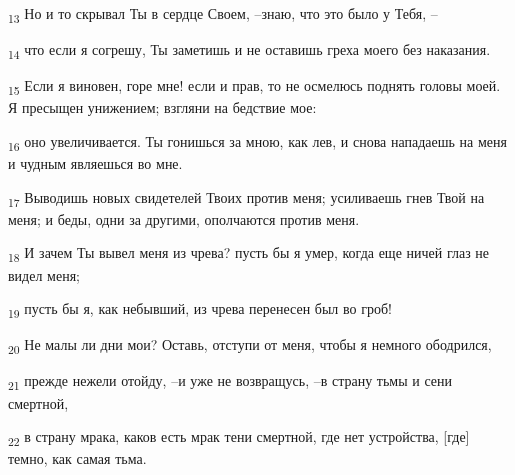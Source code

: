 \begin{tcolorbox}
\textsubscript{13} Но и то скрывал Ты в сердце Своем, --знаю, что это было у Тебя, --
\end{tcolorbox}
\begin{tcolorbox}
\textsubscript{14} что если я согрешу, Ты заметишь и не оставишь греха моего без наказания.
\end{tcolorbox}
\begin{tcolorbox}
\textsubscript{15} Если я виновен, горе мне! если и прав, то не осмелюсь поднять головы моей. Я пресыщен унижением; взгляни на бедствие мое:
\end{tcolorbox}
\begin{tcolorbox}
\textsubscript{16} оно увеличивается. Ты гонишься за мною, как лев, и снова нападаешь на меня и чудным являешься во мне.
\end{tcolorbox}
\begin{tcolorbox}
\textsubscript{17} Выводишь новых свидетелей Твоих против меня; усиливаешь гнев Твой на меня; и беды, одни за другими, ополчаются против меня.
\end{tcolorbox}
\begin{tcolorbox}
\textsubscript{18} И зачем Ты вывел меня из чрева? пусть бы я умер, когда еще ничей глаз не видел меня;
\end{tcolorbox}
\begin{tcolorbox}
\textsubscript{19} пусть бы я, как небывший, из чрева перенесен был во гроб!
\end{tcolorbox}
\begin{tcolorbox}
\textsubscript{20} Не малы ли дни мои? Оставь, отступи от меня, чтобы я немного ободрился,
\end{tcolorbox}
\begin{tcolorbox}
\textsubscript{21} прежде нежели отойду, --и уже не возвращусь, --в страну тьмы и сени смертной,
\end{tcolorbox}
\begin{tcolorbox}
\textsubscript{22} в страну мрака, каков есть мрак тени смертной, где нет устройства, [где] темно, как самая тьма.
\end{tcolorbox}
